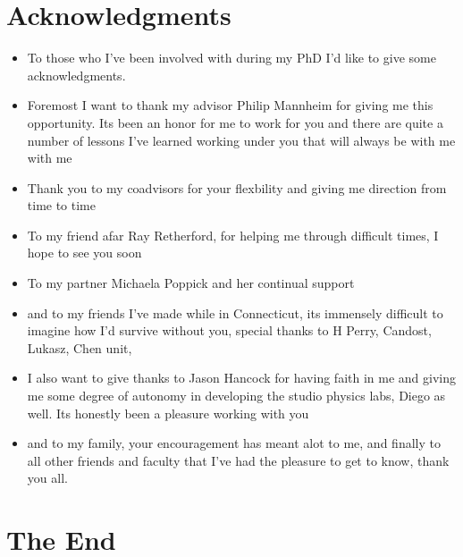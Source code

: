\documentclass[10pt,letterpaper]{article}
\numberwithin{equation}{section}
\begin{document}
\section{Acknowledgments}
\begin{itemize}
	\item To those who I've been involved with during my PhD I'd like to give some acknowledgments.
	\item Foremost I want to thank my advisor Philip Mannheim for giving me this opportunity. Its been an honor for me to work for you and there are quite a number of lessons I've learned working under you that will always be with me with me
	\item Thank you to my coadvisors for your flexbility and giving me direction from time to time
	\item To my friend afar Ray Retherford, for helping me through difficult times, I hope to see you soon
	\item To my partner Michaela Poppick and her continual support
	\item and to my friends I've made while in Connecticut, its immensely difficult to imagine how I'd survive without you, special thanks to H Perry, Candost, Lukasz, Chen unit,
	\item I also want to give thanks to Jason Hancock for having faith in me and giving me some degree of autonomy in developing the studio physics labs, Diego as well. Its honestly been a pleasure working with you
	\item and to my family, your encouragement has meant alot to me, and finally to all other friends and faculty that I've had the pleasure to get to know, thank you all. 
\end{itemize}


\section{The End}

\end{document}
